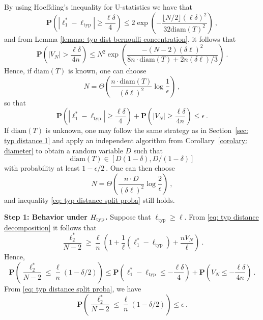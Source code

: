 \documentclass[12pt]{article}
\newcommand{\prob}[1]{\mathbf{P}\left( #1 \right)}
\newcommand{\diam}[1]{\mathrm{diam}\!\left(#1\right)}
\begin{document}
\noindent By using Hoeffding's inequality for U-statistics we have that 
\begin{equation}\label{eq: typ distance path averages 1}
    \prob{|\ell_1^*-\ell_{\textrm{typ}}|\ge \frac{\ell\delta}{4}}\le 2\exp\left(-\frac{\lfloor N/2\rfloor(\ell\delta)^2}{32\diam{T}^2} \right)~,
\end{equation}
and from Lemma \ref{lemma: typ dist bernoulli concentration}, it follows that
\begin{equation}\label{eq: typ distance path averages 2}
    \prob{|V_N|>\frac{\ell\delta}{4n}}\le N^2\exp\left( \frac{-(N-2)(\delta\ell)^2}{8n\cdot\diam{T}+2n(\delta\ell)/3}\right)~.
\end{equation}
Hence, if $\diam{T}$ is known, one can choose $$N=\Theta\left( \frac{n\cdot\diam{T}}{(\delta\ell)^2} \log\frac{1}{\epsilon}\right)~,$$
so that 
\begin{equation}\label{eq: typ distance split proba}
    \prob{|\ell_1^*-\ell_{\textrm{typ}}|\ge \frac{\ell\delta}{4}} + \prob{|V_N|\ge \frac{\ell\delta}{4n}}\le \epsilon~.
\end{equation}
If $\diam{T}$ is unknown, one may follow the same strategy as in Section~\ref{sec: typ distance 1} and apply an independent algorithm from Corollary~\ref{corolary: diameter} to obtain a random variable $D$ such that 
\[
\diam{T}\in [D(1-\delta), D/(1-\delta)]
\]
with probability at least $1-\epsilon/2~.$ One can then choose $$N=\Theta \left(\frac{n\cdot D}{(\delta\ell)^2}\log\frac{2}{\epsilon}\right)~,$$ and inequality \eqref{eq: typ distance split proba} still holds.

\noindent \textbf{Step 1: Behavior under $H_{\rm typ}$.}  Suppose that $\ell_{\textrm{typ}}\ge \ell$. From \eqref{eq: typ distance decomposition} it follows that $$\frac{\ell_2^*}{N-2}\ge \frac{\ell}{n}\left( 1 + \frac{1}{\ell}(\ell_1^*-\ell_{\textrm{typ}})+\frac{n V_N}{\ell}\right)~.$$ Hence,
\begin{equation*}
\prob{\frac{\ell_2^*}{N-2}\le \frac{\ell}{n}(1-\delta/2)}\le \prob{\ell_1^* - \ell_{\textrm{typ}}\le-\frac{\ell \delta}{4}} + \prob{V_N\le -\frac{\ell \delta}{4n}}~.   
\end{equation*}
From \eqref{eq: typ distance split proba}, we have 
$$\prob{\frac{\ell_2^*}{N-2}\le \frac{\ell}{n}(1-\delta/2)} \le \epsilon~.$$
\end{document}
